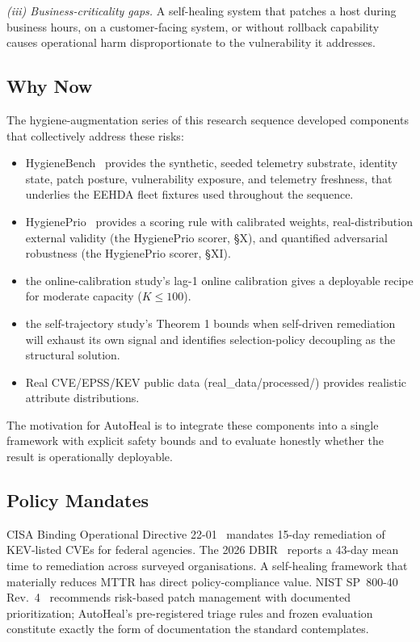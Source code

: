 \textit{(iii) Business-criticality gaps.} A self-healing system that
patches a host during business hours, on a customer-facing system,
or without rollback capability causes operational harm
disproportionate to the vulnerability it addresses.

\subsection{Why Now}

The hygiene-augmentation series of this research sequence developed components that
collectively address these risks:

\begin{itemize}
\item HygieneBench~\cite{paper3hygienebench} provides the
synthetic, seeded telemetry substrate, identity state, patch
posture, vulnerability exposure, and telemetry freshness, that
underlies the EEHDA fleet fixtures used throughout the sequence.
\item HygienePrio~\cite{paper4hygieneprio} provides a
scoring rule with calibrated weights, real-distribution external
validity (the HygienePrio scorer, \S X), and
quantified adversarial robustness (the HygienePrio scorer, \S XI).
\item the online-calibration study's lag-1 online calibration gives
a deployable recipe for moderate capacity ($K \leq 100$).
\item the self-trajectory study's Theorem 1 bounds when
self-driven remediation will exhaust its own signal and identifies
selection-policy decoupling as the structural solution.
\item Real CVE/EPSS/KEV public data
(real\_data/processed/) provides realistic attribute distributions.
\end{itemize}

The motivation for AutoHeal is to integrate these components into
a single framework with explicit safety bounds and to evaluate
honestly whether the result is operationally deployable.

\subsection{Policy Mandates}

CISA Binding Operational Directive 22-01~\cite{cisa2021bod2201}
mandates 15-day remediation of KEV-listed CVEs for federal agencies.
The 2026 DBIR~\cite{verizon2026dbir} reports a 43-day mean time to
remediation across surveyed organisations. A self-healing framework
that materially reduces MTTR has direct policy-compliance value.
NIST SP~800-40 Rev.~4~\cite{nist2022sp80040r4} recommends
risk-based patch management with documented prioritization;
AutoHeal's pre-registered triage rules and frozen evaluation
constitute exactly the form of documentation the standard
contemplates.
